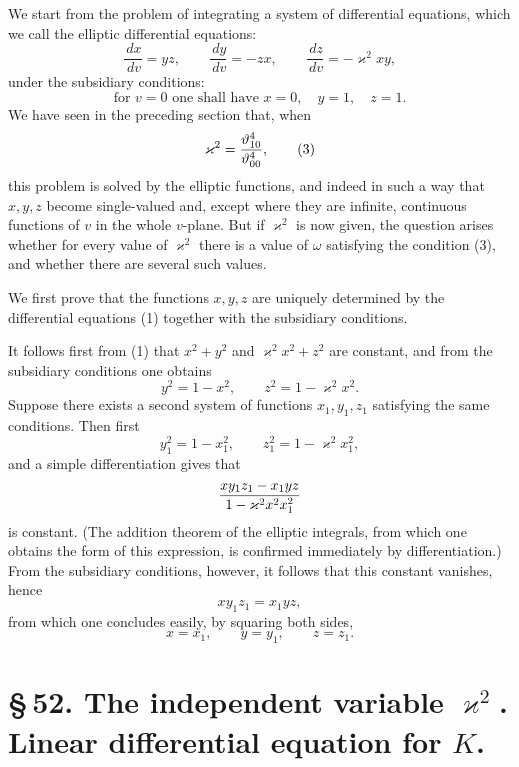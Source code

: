 \documentclass[11pt]{article}
\providecommand{\dd}{\,d}
\providecommand{\tht}{\vartheta}
\begin{document}
We start from the problem of integrating a system of differential equations, which we call the elliptic differential equations:
\begin{equation}
\frac{\dd x}{\dd v}=yz,\qquad
\frac{\dd y}{\dd v}=-zx,\qquad
\frac{\dd z}{\dd v}=-\varkappa^2xy,
\tag{1}
\end{equation}
under the subsidiary conditions:
\begin{equation}
\text{for }v=0\text{ one shall have }x=0,
\quad y=1,
\quad z=1.
\tag{2}
\end{equation}
We have seen in the preceding section that, when
\begin{equation}
\varkappa^2={\tht_{10}^4\over\tht_{00}^4},
\tag{3}
\end{equation}
this problem is solved by the elliptic functions, and indeed in such a way that $x,y,z$ become single-valued and, except where they are infinite, continuous functions of $v$ in the whole $v$-plane. But if $\varkappa^2$ is now given, the question arises whether for every value of $\varkappa^2$ there is a value of $\omega$ satisfying the condition (3), and whether there are several such values.

We first prove that the functions $x,y,z$ are uniquely determined by the differential equations (1) together with the subsidiary conditions.

It follows first from (1) that $x^2+y^2$ and $\varkappa^2x^2+z^2$ are constant, and from the subsidiary conditions one obtains
\begin{equation}
y^2=1-x^2,
\qquad
z^2=1-\varkappa^2x^2.
\tag{4}
\end{equation}
Suppose there exists a second system of functions $x_1,y_1,z_1$ satisfying the same conditions. Then first
\[
y_1^2=1-x_1^2,
\qquad
z_1^2=1-\varkappa^2x_1^2,
\]
and a simple differentiation gives that
\[
{xy_1z_1-x_1yz\over 1-\varkappa^2x^2x_1^2}
\]
is constant. (The addition theorem of the elliptic integrals, from which one obtains the form of this expression, is confirmed immediately by differentiation.) From the subsidiary conditions, however, it follows that this constant vanishes, hence
\[
xy_1z_1=x_1yz,
\]
from which one concludes easily, by squaring both sides,
\[
x=x_1,
\qquad y=y_1,
\qquad z=z_1.
\]

\section*{\S\,52. The independent variable $\varkappa^2$. Linear differential equation for $K$.}
\end{document}
